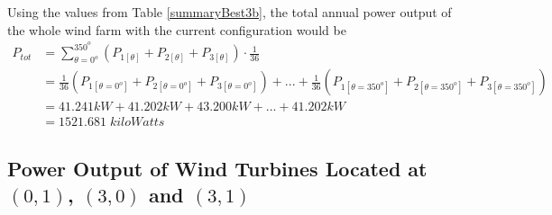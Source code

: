 	Using the values from Table \ref{summaryBest3b}, the total annual power output of the whole wind farm with the current configuration would be
    \begin{align*}
        P_{tot}
        &= \sum_{\theta=0^o}^{350^o} \left( P_{1[\theta]} + P_{2[\theta]} + P_{3[\theta]} \right) \cdot \frac{1}{36} \\
        &= \frac{1}{36}\left( P_{1[\theta=0^o]} + P_{2[\theta=0^o]} + P_{3[\theta=0^o]} \right) +...+ \frac{1}{36}\left( P_{1[\theta=350^o]} + P_{2[\theta=350^o]} + P_{3[\theta=350^o]} \right) \\
        &= 41.241kW + 41.202kW + 43.200kW +...+ 41.202kW \\
        &= 1521.681\;kiloWatts
    \end{align*}
	
\subsection{Power Output of Wind Turbines Located at $(0,1)$, $(3,0)$ and $(3,1)$}


